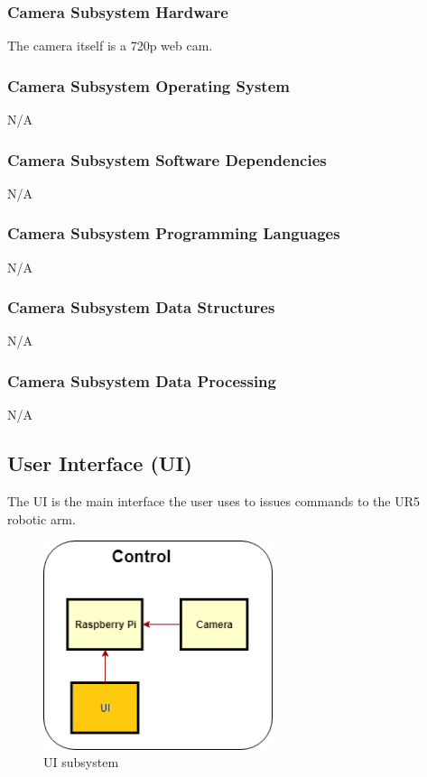 \subsubsection{Camera Subsystem Hardware}
The camera itself is a 720p web cam.

\subsubsection{Camera Subsystem Operating System}
N/A

\subsubsection{Camera Subsystem Software Dependencies}
N/A

\subsubsection{Camera Subsystem Programming Languages}
N/A

\subsubsection{Camera Subsystem Data Structures}
N/A

\subsubsection{Camera Subsystem Data Processing}
N/A

\subsection{User Interface (UI)}
The UI is the main interface the user uses to issues commands to the UR5 robotic arm.

\begin{figure}[h!]
	\centering
 	\includegraphics[width=0.60\textwidth]{images/Control_Layer_UI}
 \caption{UI subsystem}
\end{figure}

